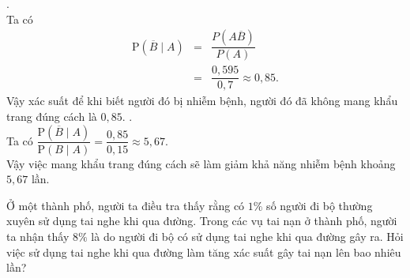 \begin{ex}
{\begin{itemchoice}
		.\\
		Ta có
		\allowdisplaybreaks
		\begin{eqnarray*}
			\mathrm{P}\left(\overline{B}\mid A\right)& =& \dfrac{P\left(A\overline{B}\right)}{P(A)}
			\\
			&=&\dfrac{0{,}595}{0{,}7} \approx 0{,}85.
		\end{eqnarray*}
	Vậy xác suất để khi biết người đó bị nhiễm bệnh, người đó đã không mang khẩu trang đúng cách là $0{,}85$.
		.\\
		Ta có $\dfrac{\mathrm{P}\left(\overline{B}\mid A\right)}{\mathrm{P}(B\mid A)} = \dfrac{0{,}85}{0{,}15} \approx 5{,}67 $.\\
		Vậy việc mang khẩu trang đúng cách sẽ làm giảm khả năng nhiễm bệnh khoảng $5{,}67$ lần.
	\end{itemchoice}
}
\end{ex}

\begin{bt}%

Ở một thành phố, người ta điều tra thấy rằng có \(1\%\) số người đi bộ thường xuyên sử dụng tai nghe khi qua đường. Trong các vụ tai nạn ở thành phố, người ta nhận thấy \(8\%\) là do người đi bộ có sử dụng tai nghe khi qua đường gây ra. Hỏi việc sử dụng tai nghe khi qua đường làm tăng xác suất gây tai nạn lên bao nhiêu lần?
\end{bt}
